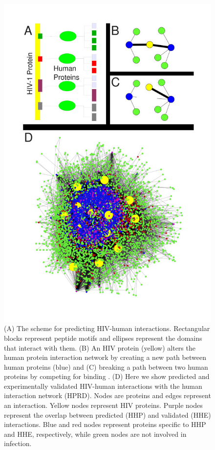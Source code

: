 \begin{figure}
\begin{center}
\includegraphics[scale=3.7]{figs/medGen_3}
\end{center}
\caption[Network diagrams for HIV-human protein interactions]{\small
  (A) The scheme for predicting HIV-human interactions. Rectangular
  blocks represent peptide motifs and ellipses represent the domains
  that interact with them. (B) An HIV protein (yellow) alters the
  human protein interaction network by creating a new path between
  human proteins (blue) and (C) breaking a path between two human
  proteins by competing for binding
  \cite{tournier06,sodhi04,dampier07}. (D) Here we show predicted and
  experimentally validated HIV-human interactions with the human
  interaction network (HPRD). Nodes are proteins and edges represent
  an interaction. Yellow nodes represent HIV proteins. Purple nodes
  represent the overlap between predicted (HHP) and validated (HHE)
  interactions. Blue and red nodes represent proteins specific to HHP
  and HHE, respectively, while green nodes are not involved in
  infection. \label{fig:medGen:fig3}}
\end{figure}

